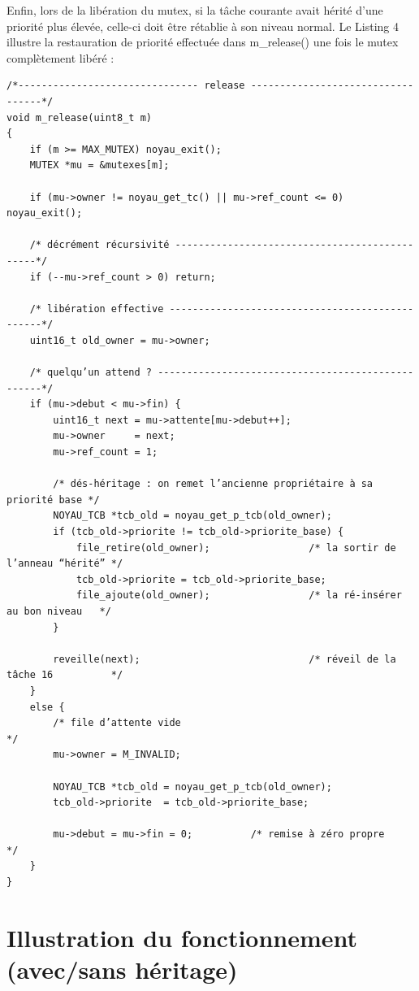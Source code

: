 \documentclass{latexPackage/utc-report/utc-report}
\begin{document}
Enfin, lors de la libération du mutex, si la tâche courante avait hérité d’une priorité plus élevée, celle-ci doit être rétablie à son niveau normal. Le Listing 4 illustre la restauration de priorité effectuée dans m\_release() une fois le mutex complètement libéré :

\begin{verbatim}
/*------------------------------- release ----------------------------------*/
void m_release(uint8_t m)
{
    if (m >= MAX_MUTEX) noyau_exit();
    MUTEX *mu = &mutexes[m];

    if (mu->owner != noyau_get_tc() || mu->ref_count <= 0) noyau_exit();

    /* décrément récursivité ----------------------------------------------*/
    if (--mu->ref_count > 0) return;

    /* libération effective ------------------------------------------------*/
    uint16_t old_owner = mu->owner;

    /* quelqu’un attend ? --------------------------------------------------*/
    if (mu->debut < mu->fin) {
        uint16_t next = mu->attente[mu->debut++];
        mu->owner     = next;
        mu->ref_count = 1;

        /* dés-héritage : on remet l’ancienne propriétaire à sa priorité base */
        NOYAU_TCB *tcb_old = noyau_get_p_tcb(old_owner);
        if (tcb_old->priorite != tcb_old->priorite_base) {
            file_retire(old_owner);                 /* la sortir de l’anneau “hérité” */
            tcb_old->priorite = tcb_old->priorite_base;
            file_ajoute(old_owner);                 /* la ré-insérer au bon niveau   */
        }

        reveille(next);                             /* réveil de la tâche 16          */
    }
    else {
        /* file d’attente vide                                              */
        mu->owner = M_INVALID;

        NOYAU_TCB *tcb_old = noyau_get_p_tcb(old_owner);
        tcb_old->priorite  = tcb_old->priorite_base;

        mu->debut = mu->fin = 0;          /* remise à zéro propre           */
    }
}
\end{verbatim}

\pagebreak

\section{Illustration du fonctionnement (avec/sans héritage)}
\end{document}
